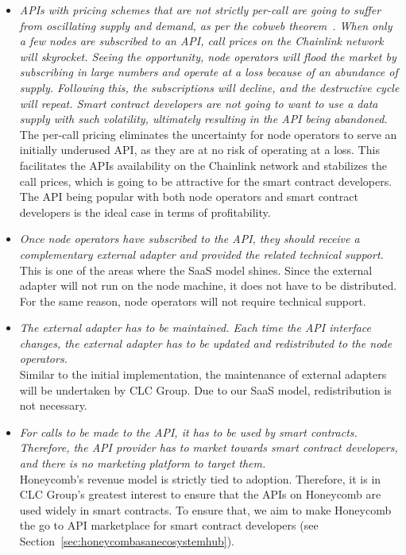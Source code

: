 \documentclass[12pt]{article}
\begin{document}
\begin{itemize}
	\item \textit{APIs with pricing schemes that are not strictly per-call are going to suffer from oscillating supply and demand, as per the cobweb theorem~\cite{Ezekiel:1938}.
	When only a few nodes are subscribed to an API, call prices on the Chainlink network will skyrocket.
	Seeing the opportunity, node operators will flood the market by subscribing in large numbers and operate at a loss because of an abundance of supply.
	Following this, the subscriptions will decline, and the destructive cycle will repeat.
	Smart contract developers are not going to want to use a data supply with such volatility, ultimately resulting in the API being abandoned.}\medskip\\
	The per-call pricing eliminates the uncertainty for node operators to serve an initially underused API, as they are at no risk of operating at a loss.
	This facilitates the APIs availability on the Chainlink network and stabilizes the call prices, which is going to be attractive for the smart contract developers.
	The API being popular with both node operators and smart contract developers is the ideal case in terms of profitability.
	
	\item \textit{Once node operators have subscribed to the API, they should receive a complementary external adapter and provided the related technical support.}\medskip\\
	This is one of the areas where the SaaS model shines.
	Since the external adapter will not run on the node machine, it does not have to be distributed.
	For the same reason, node operators will not require technical support.
	
	\item \textit{The external adapter has to be maintained.
	Each time the API interface changes, the external adapter has to be updated and redistributed to the node operators.}\medskip\\
	Similar to the initial implementation, the maintenance of external adapters will be undertaken by CLC Group.
	Due to our SaaS model, redistribution is not necessary.
	
	\item \textit{For calls to be made to the API, it has to be used by smart contracts.
	Therefore, the API provider has to market towards smart contract developers, and there is no marketing platform to target them.}\medskip\\
	Honeycomb’s revenue model is strictly tied to adoption.
	Therefore, it is in CLC Group’s greatest interest to ensure that the APIs on Honeycomb are used widely in smart contracts.
	To ensure that, we aim to make Honeycomb the go to API marketplace for smart contract developers (see Section~\ref{sec:honeycombasanecosystemhub}).
	

\end{itemize}
\end{document}
